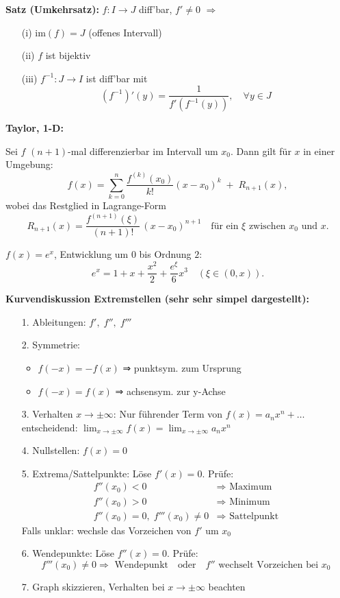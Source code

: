 \textbf{Satz (Umkehrsatz):}  
\(f: I \to J\) diff'bar, \(f' \ne 0\)  
\(\Rightarrow\)
\begin{itemize}
  \item[(i)] \(\text{im}(f) = J\) (offenes Intervall)
  \item[(ii)] \(f\) ist bijektiv
  \item[(iii)] \(f^{-1}: J \to I\) ist diff'bar mit  
    \[
    (f^{-1})'(y) = \frac{1}{f'(f^{-1}(y))}, \quad \forall y \in J
    \]
\end{itemize}

\textbf{Taylor, 1-D:}
\begin{theorem}
  Sei $f$ $(n+1)$-mal differenzierbar im Intervall um $x_0$. Dann gilt für $x$ in einer Umgebung:
  \[
    f(x) = \sum_{k=0}^n \frac{f^{(k)}(x_0)}{k!}(x - x_0)^k 
    \;+\; R_{n+1}(x),
  \]
  wobei das Restglied in Lagrange-Form
  \[
    R_{n+1}(x) = \frac{f^{(n+1)}(\xi)}{(n+1)!}\,(x - x_0)^{n+1}
    \quad\text{für ein }\xi\text{ zwischen }x_0\text{ und }x.
  \]
\end{theorem}
\begin{example}
  $f(x) = e^x$, Entwicklung um $0$ bis Ordnung $2$:
  \[
    e^x = 1 + x + \frac{x^2}{2} + \frac{e^\xi}{6} x^3 \quad(\xi\in(0,x)).
  \]
\end{example}

\textbf{Kurvendiskussion Extremstellen (sehr sehr simpel dargestellt):}
\begin{itemize}
  \item[1.] Ableitungen: \( f',\; f'',\; f''' \)
  \item[2.] Symmetrie:
    \begin{itemize}
      \item \( f(-x) = -f(x) \) ⇒ punktsym. zum Ursprung
      \item \( f(-x) = f(x) \) ⇒ achsensym. zur y-Achse
    \end{itemize}
  \item[3.] Verhalten \( x \to \pm\infty \):  
    Nur führender Term von \( f(x) = a_n x^n + \ldots \) entscheidend:  
    \( \lim_{x \to \pm\infty} f(x) = \lim_{x \to \pm\infty} a_n x^n \)
  \item[4.] Nullstellen: \( f(x) = 0 \)
  \item[5.] Extrema/Sattelpunkte: Löse \( f'(x) = 0 \). Prüfe:
    \[
    \begin{aligned}
      f''(x_0) < 0 &\Rightarrow \text{ Maximum} \\
      f''(x_0) > 0 &\Rightarrow \text{ Minimum} \\
      f''(x_0) = 0,\; f'''(x_0) \neq 0 &\Rightarrow \text{ Sattelpunkt}
    \end{aligned}
    \]
    Falls unklar: wechsle das Vorzeichen von \( f' \) um \( x_0 \)
  \item[6.] Wendepunkte: Löse \( f''(x) = 0 \). Prüfe:
    \[
    f'''(x_0) \neq 0 \Rightarrow \text{ Wendepunkt}
    \quad \text{oder} \quad
    f'' \text{ wechselt Vorzeichen bei } x_0
    \]
  \item[7.] Graph skizzieren, Verhalten bei \( x \to \pm\infty \) beachten
\end{itemize}


